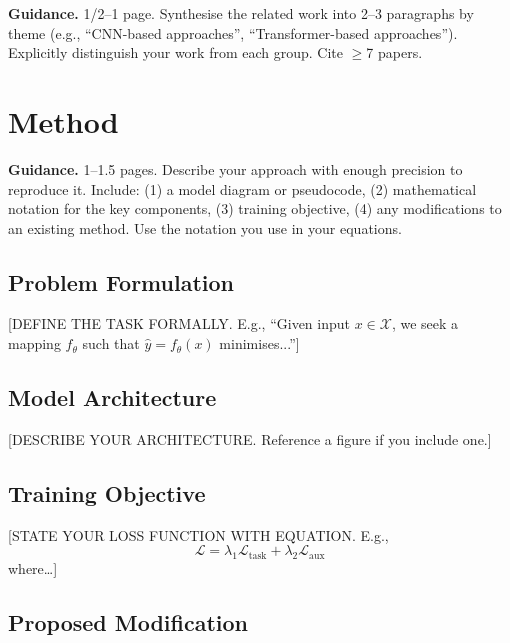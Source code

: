 \documentclass[11pt, letterpaper]{article}
\begin{document}
\begin{guidancebox}
\textbf{Guidance.} 1/2--1 page. Synthesise the related work into 2--3 paragraphs
by theme (e.g., ``CNN-based approaches'', ``Transformer-based approaches'').
Explicitly distinguish your work from each group. Cite $\geq$7 papers.
\end{guidancebox}


\section{Method}

\begin{guidancebox}
\textbf{Guidance.} 1--1.5 pages. Describe your approach with enough precision
to reproduce it. Include: (1) a model diagram or pseudocode, (2) mathematical
notation for the key components, (3) training objective, (4) any modifications
to an existing method. Use the notation you use in your equations.
\end{guidancebox}

\subsection{Problem Formulation}

[DEFINE THE TASK FORMALLY. E.g., ``Given input $x \in \mathcal{X}$, we seek a
mapping $f_\theta$ such that $\hat{y} = f_\theta(x)$ minimises...'']

\subsection{Model Architecture}

[DESCRIBE YOUR ARCHITECTURE. Reference a figure if you include one.]

\subsection{Training Objective}

[STATE YOUR LOSS FUNCTION WITH EQUATION. E.g.,
\begin{equation}
  \mathcal{L} = \lambda_1 \mathcal{L}_{\mathrm{task}} + \lambda_2 \mathcal{L}_{\mathrm{aux}}
  \label{eq:loss}
\end{equation}
where\ldots]

\subsection{Proposed Modification}
\end{document}
